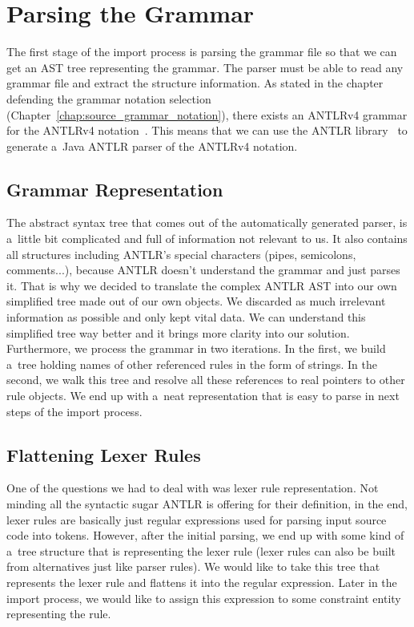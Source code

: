 \section{Parsing the Grammar}
\label{chap:parsing_the_grammar}

The first stage of the import process is parsing the grammar file so that we can get an AST tree representing the grammar.
The parser must be able to read any grammar file and extract the structure information.
As stated in the chapter defending the grammar notation selection (Chapter~\ref{chap:source_grammar_notation}), there exists an ANTLRv4 grammar for the ANTLRv4 notation~\cite{ANTLR4reference}.
This means that we can use the ANTLR library~\cite{ANTLR4} to generate a~Java ANTLR parser of the ANTLRv4 notation.

\subsection{Grammar Representation}

The abstract syntax tree that comes out of the automatically generated parser, is a~little bit complicated and full of information not relevant to us.
It also contains all structures including ANTLR's special characters (pipes, semicolons, comments...), because ANTLR doesn't understand the grammar and just parses it.
That is why we decided to translate the complex ANTLR AST into our own simplified tree made out of our own objects.
We discarded as much irrelevant information as possible and only kept vital data.
We can understand this simplified tree way better and it brings more clarity into our solution.
\\

Furthermore, we process the grammar in two iterations.
In the first, we build a~tree holding names of other referenced rules in the form of strings.
In the second, we walk this tree and resolve all these references to real pointers to other rule objects.
We end up with a~neat representation that is easy to parse in next steps of the import process.

\subsection{Flattening Lexer Rules}
One of the questions we had to deal with was lexer rule representation.
Not minding all the syntactic sugar ANTLR is offering for their definition, in the end, lexer rules are basically just regular expressions used for parsing input source code into tokens.
However, after the initial parsing, we end up with some kind of a~tree structure that is representing the lexer rule (lexer rules can also be built from alternatives just like parser rules).
We would like to take this tree that represents the lexer rule and flattens it into the regular expression.
Later in the import process, we would like to assign this expression to some constraint entity representing the rule.


